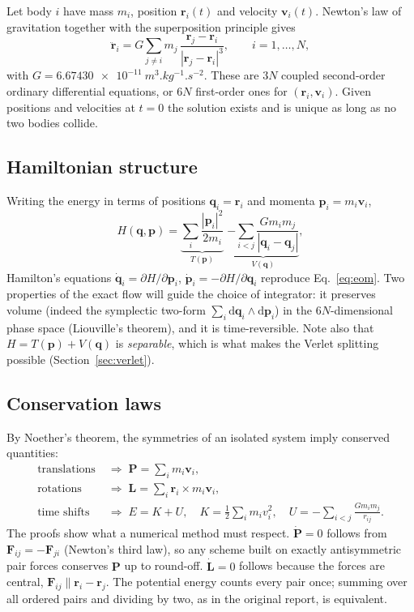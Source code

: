 \documentclass[11pt,a4paper]{article}
\newcommand{\vect}[1]{\mathbf{#1}}
\newcommand{\dd}{\mathrm{d}}
\begin{document}
Let body $i$ have mass $m_i$, position $\vect r_i(t)$ and velocity $\vect v_i(t)$.
Newton's law of gravitation together with the superposition principle gives
\begin{equation}
  \ddot{\vect r}_i = G\sum_{j\ne i} m_j\,\frac{\vect r_j-\vect r_i}{|\vect r_j-\vect r_i|^{3}},
  \qquad i=1,\dots,N,
  \label{eq:eom}
\end{equation}
with $G=\SI{6.67430e-11}{m^3.kg^{-1}.s^{-2}}$. These are $3N$ coupled second-order
ordinary differential equations, or $6N$ first-order ones for $(\vect r_i,\vect v_i)$.
Given positions and velocities at $t=0$ the solution exists and is unique as long as no
two bodies collide.

\subsection{Hamiltonian structure}

Writing the energy in terms of positions $\vect q_i=\vect r_i$ and momenta
$\vect p_i=m_i\vect v_i$,
\begin{equation}
  H(\vect q,\vect p)=\underbrace{\sum_i\frac{|\vect p_i|^2}{2m_i}}_{T(\vect p)}
  \;\underbrace{-\sum_{i<j}\frac{G m_i m_j}{|\vect q_i-\vect q_j|}}_{V(\vect q)},
  \label{eq:hamiltonian}
\end{equation}
Hamilton's equations $\dot{\vect q}_i=\partial H/\partial\vect p_i$,
$\dot{\vect p}_i=-\partial H/\partial\vect q_i$ reproduce Eq.~\eqref{eq:eom}. Two
properties of the exact flow will guide the choice of integrator: it preserves volume
(indeed the symplectic two-form $\sum_i \dd\vect q_i\wedge \dd\vect p_i$) in the
$6N$-dimensional phase space (Liouville's theorem), and it is time-reversible. Note also
that $H=T(\vect p)+V(\vect q)$ is \emph{separable}, which is what makes the Verlet
splitting possible (Section~\ref{sec:verlet}).

\subsection{Conservation laws}

By Noether's theorem, the symmetries of an isolated system imply conserved quantities:
\begin{align}
  \text{translations} &\;\Rightarrow\; \vect P=\sum_i m_i\vect v_i, \\
  \text{rotations}    &\;\Rightarrow\; \vect L=\sum_i \vect r_i\times m_i\vect v_i, \\
  \text{time shifts}  &\;\Rightarrow\; E=K+U,\quad K=\tfrac12\sum_i m_i v_i^2,\quad
                        U=-\sum_{i<j}\frac{G m_i m_j}{r_{ij}} .
  \label{eq:energy}
\end{align}
The proofs show what a numerical method must respect. $\dot{\vect P}=0$ follows from
$\vect F_{ij}=-\vect F_{ji}$ (Newton's third law), so any scheme built on exactly
antisymmetric pair forces conserves $\vect P$ up to round-off. $\dot{\vect L}=0$
follows because the forces are central, $\vect F_{ij}\parallel\vect r_i-\vect r_j$.
The potential energy counts every pair once; summing over all ordered pairs and dividing
by two, as in the original report, is equivalent.
\end{document}
